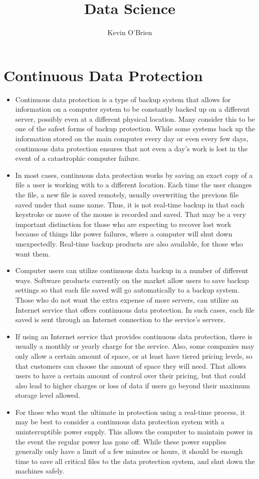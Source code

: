\documentclass[12pt]{article}
\title{Data Science}
\author{Kevin O'Brien}
\begin{document}
	\section*{Continuous Data Protection}
	
\begin{itemize}
\item Continuous data protection is a type of backup system that allows for information on a computer system to be constantly backed up on a different server, possibly even at a different physical location. Many consider this to be one of the safest forms of backup protection. While some systems back up the information stored on the main computer every day or even every few days, continuous data protection ensures that not even a day’s work is lost in the event of a catastrophic computer failure.

\item In most cases, continuous data protection works by saving an exact copy of a file a user is working with to a different location. Each time the user changes the file, a new file is saved remotely, usually overwriting the previous file saved under that same name. Thus, it is not real-time backup in that each keystroke or move of the mouse is recorded and saved. That may be a very important distinction for those who are expecting to recover lost work because of things like power failures, where a computer will shut down unexpectedly. Real-time backup products are also available, for those who want them.

\item Computer users can utilize continuous data backup in a number of different ways. Software products currently on the market allow users to save backup settings so that each file saved will go automatically to a backup system. Those who do not want the extra expense of more servers, can utilize an Internet service that offers continuous data protection. In such cases, each file saved is sent through an Internet connection to the service’s servers.

\item If using an Internet service that provides continuous data protection, there is usually a monthly or yearly charge for the service. Also, some companies may only allow a certain amount of space, or at least have tiered pricing levels, so that customers can choose the amount of space they will need. That allows users to have a certain amount of control over their pricing, but that could also lead to higher charges or loss of data if users go beyond their maximum storage level allowed.

\item For those who want the ultimate in protection using a real-time process, it may be best to consider a continuous data protection system with a uninterruptible power supply. This allows the computer to maintain power in the event the regular power has gone off. While these power supplies generally only have a limit of a few minutes or hours, it should be enough time to save all critical files to the data protection system, and shut down the machines safely.
\end{itemize}
\end{document}
